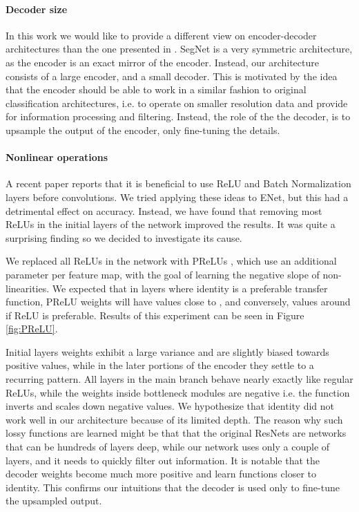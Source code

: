 \documentclass{article}
\begin{document}
\paragraph{Decoder size}
In this work we would like to provide a different view on encoder-decoder architectures than the one presented in \cite{badrinarayanan15}.
SegNet is a very symmetric architecture, as the encoder is an exact mirror of the encoder.
Instead, our architecture consists of a large encoder, and a small decoder.
This is motivated by the idea that the encoder should be able to work in a similar fashion to original classification architectures, i.e. to operate on smaller resolution data and provide for information processing and filtering.
Instead, the role of the the decoder, is to upsample the output of the encoder, only fine-tuning the details.

\paragraph{Nonlinear operations}
A recent paper \cite{he2016identity} reports that it is beneficial to use ReLU and Batch Normalization layers before convolutions.
We tried applying these ideas to ENet, but this had a detrimental effect on accuracy.
Instead, we have found that removing most ReLUs in the initial layers of the network improved the results.
It was quite a surprising finding so we decided to investigate its cause.

We replaced all ReLUs in the network with PReLUs \cite{he2015}, which use an additional parameter per feature map, with the goal of learning the negative slope of non-linearities.
We expected that in layers where identity is a preferable transfer function, PReLU weights will have values close to , and conversely, values around  if ReLU is preferable.
Results of this experiment can be seen in Figure \ref{fig:PReLU}.

Initial layers weights exhibit a large variance and are slightly biased towards positive values, while in the later portions of the encoder they settle to a recurring pattern.
All layers in the main branch behave nearly exactly like regular ReLUs, while the weights inside bottleneck modules are negative i.e. the function inverts and scales down negative values.
We hypothesize that identity did not work well in our architecture because of its limited depth.
The reason why such lossy functions are learned might be that that the original ResNets \cite{he2016identity} are networks that can be hundreds of layers deep, while our network uses only a couple of layers, and it needs to quickly filter out information.
It is notable that the decoder weights become much more positive and learn functions closer to identity.
This confirms our intuitions that the decoder is used only to fine-tune the upsampled output.
\end{document}
